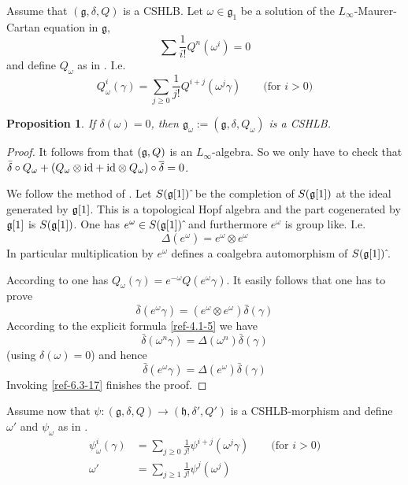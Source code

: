 \documentclass{amsart}
\numberwithin{equation}{section}
\newtheorem{propositions}[lemmas]{Proposition}
\theoremstyle{definition}
\theoremstyle{remark}
\begin{document}
Assume that $(\mathfrak{g},\delta,Q)$ is a CSHLB.
Let $\omega\in\mathfrak{g}_1$ be a solution of the
$L_\infty$-Maurer-Cartan equation in $\mathfrak{g}$, 
\[
\sum \frac{1}{i!}Q^n(\omega^i)=0
\]
and define $Q_\omega$ as in \cite{ye7}. I.e.
\begin{equation}
\label{ref-6.2-15}
Q_\omega^i(\gamma)=\sum_{j\ge 0} \frac{1}{j!} Q^{i+j}
(\omega^j \gamma)\qquad \text{(for $i>0$)}
\end{equation}
\begin{propositions}
\label{ref-6.2.1-16}
  If $\delta(\omega)=0$, then
  $\mathfrak{g}_\omega:=(\mathfrak{g},\delta, Q_\omega)$ is a CSHLB.
\end{propositions}
\begin{proof} 
It follows from \cite{ye7} that $(\frak{g},Q)$ is an
  $L_\infty$-algebra.  
So we only have to check that $\bar{\delta}\circ
  Q_\omega+(Q_\omega\otimes{\rm id}+{\rm id}\otimes
  Q_\omega)\circ\overline{\delta}=0$. 

We follow the method of \cite{ye7}. Let $S(\frak{g}[1])\,\hat{}$ be the
completion of $S(\frak{g}[1])$ at the ideal generated by $\frak{g}[1]$.
This is a topological Hopf algebra and the part cogenerated by $\frak{g}[1]$
is $S(\frak{g}[1])$. 
One has $e^\omega\in S(\frak{g}[1])\,\hat{}$ and furthermore \cite{ye7}
$e^{\omega}$ is group like. I.e.
\begin{equation}
\label{ref-6.3-17}
\Delta(e^{\omega})=e^{\omega}\otimes e^{\omega}
\end{equation}
In particular multiplication by $e^{\omega}$ defines a coalgebra automorphism
of $S(\frak{g}[1])\,\hat{}$. 

According to \cite{ye7} one has 
$Q_\omega(\gamma)=e^{-\omega}Q(e^{\omega}\gamma)$. 
It easily follows that one has to prove
\begin{equation}
\label{ref-6.4-18}
\bar{\delta}(e^{\omega}\gamma)=(e^\omega\otimes e^\omega )\bar{\delta}(\gamma)
\end{equation}
According to the explicit formula \eqref{ref-4.1-5} we have
\[
\bar{\delta}(\omega^n\gamma)=\Delta(\omega^n)\bar{\delta}(\gamma)
\]
(using $\delta(\omega)=0$) and hence
\[
\bar{\delta}(e^{\omega}\gamma)=\Delta(e^{\omega})\bar{\delta}(\gamma)
\]
Invoking \eqref{ref-6.3-17} finishes the proof. 
\end{proof}
Assume now that $\psi:(\mathfrak{g},\delta,Q)\to(\mathfrak{h},\delta',Q')$
is a CSHLB-morphism and define $\omega'$ and $\psi_\omega$ as in
\cite{ye7}.
\begin{align*}
\psi_\omega^i(\gamma)&=\sum_{j\ge 0} \frac{1}{j!} \psi^{i+j}
(\omega^j \gamma)\qquad \text{(for $i>0$)}\\
\omega'&=\sum_{j\ge 1} \frac{1}{j!} \psi^j
(\omega^j )
\end{align*}
\end{document}
